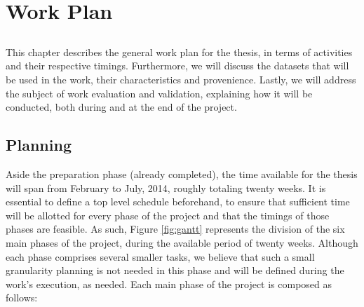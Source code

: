 \chapter{Work Plan} \label{chap:workplan}

\section*{}

This chapter describes the general work plan for the thesis, in terms of
activities and their respective timings. Furthermore, we will discuss the
datasets that will be used in the work, their characteristics and provenience.
Lastly, we will address the subject of work evaluation and validation,
explaining how it will be conducted, both during and at the end of the project.

\section{Planning}\label{sec:planning}

Aside the preparation phase (already completed), the time available for the
thesis will span from February to July, 2014, roughly totaling twenty weeks. It
is essential to define a top level schedule beforehand, to ensure that
sufficient time will be allotted for every phase of the project and that the
timings of those phases are feasible. As such, Figure \ref{fig:gantt} represents
the division of the six main phases of the project, during the available period
of twenty weeks. Although each phase comprises several smaller tasks, we believe
that such a small granularity planning is not needed in this phase and will be
defined during the work's execution, as needed. Each main phase of the project
is composed as follows:

